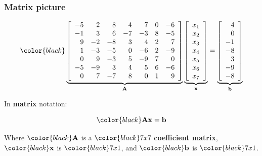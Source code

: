 \documentclass[compress]{beamer}
\newcommand{\black}[1]{{\color{black}#1}}
\renewcommand{\emph}[1]{\textbf{\black{#1}}}
\newcommand{\beq}[1]{\[\black{#1}\]}
\begin{document}
\begin{frame}
\frametitle{Matrix picture}

\beq{
\underbrace{\left[
\begin{array}{rrrrrrrr}
-5 & 2 & 8 & 4 & 7 & 0 & -6\\
-1 & 3 & 6 & -7 & -3 & 8 & -5\\
9 & -2 & -8 & 3 & 4 & 2 & 7\\
1 & -3 & -5 & 0 & -6 & 2 & -9\\
0 & 9 & -3 & 5 & -9 & 7 & 0\\
-5 & -9 & 3 & 4 & 5 & 6 & -6\\
0 & 7 & -7 & 8 & 0 & 1 & 9\\
\end{array}\right]}_{\A}
\underbrace{\left[
\begin{array}{r}
     x_1\\
     x_2\\
     x_3\\
    x_4\\
    x_5\\
    x_6\\
    x_7\\
\end{array}
\right]}_{\x}
=\underbrace{\left[
\begin{array}{r}
     4\\
     0\\
    -1\\
    -8\\
     3\\
    -9\\
    -8\\
\end{array}
\right]}_{\b}
}

In \emph{matrix} notation:

\beq{
\A\x = \b
}

Where $\black{\A}$ is a $\black{7x7}$ \emph{coefficient matrix}, $\black{\x}$ is $\black{7x1}$, and $\black{\b}$ is $\black{7x1}$.


\end{frame}

\end{document}
